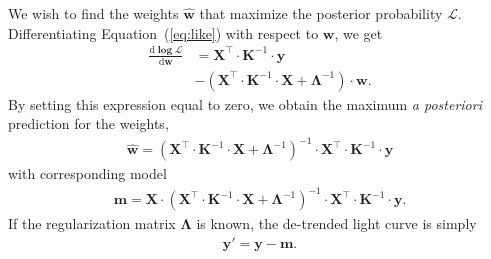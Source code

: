 \documentclass[]{emulateapj}
\begin{document}
We wish to find the weights $\mathbf{\hat{w}}$ that maximize the posterior probability 
$\mathcal{L}$. Differentiating 
Equation~(\ref{eq:like}) with respect to $\mathbf{w}$, we get
%
\begin{align}
\label{eq:gradlike}
\frac{\mathrm{d}\mathbf{\log\mathcal{L}}}{\mathrm{d}\mathbf{w}} &= 
%
\mathbf{X}^\top \cdot \mathbf{K}^{-1} \cdot \mathbf{y} \nonumber\\
%
&- \left( \mathbf{X}^\top \cdot \mathbf{K}^{-1} \cdot \mathbf{X} + \mathbf{\Lambda}^{-1} \right) \cdot \mathbf{w}.
\end{align}
%
By setting this expression equal to zero, we obtain the maximum \emph{a posteriori} prediction 
for the weights,
%
\begin{align}
\label{eq:what}
\mathbf{\hat{w}} = 
%
\left( \mathbf{X}^\top \cdot \mathbf{K}^{-1} \cdot \mathbf{X} + \mathbf{\Lambda}^{-1} \right)^{-1}
%
\cdot \mathbf{X}^\top \cdot \mathbf{K}^{-1} \cdot \mathbf{y}
\end{align}
with corresponding model
%
\begin{align}
\label{eq:model_slow}
\mathbf{m} = 
%
\mathbf{X} \cdot
%
\left( \mathbf{X}^\top \cdot \mathbf{K}^{-1} \cdot \mathbf{X} + \mathbf{\Lambda}^{-1} \right)^{-1}
%
\cdot \mathbf{X}^\top \cdot \mathbf{K}^{-1} \cdot \mathbf{y}.
\end{align}
%
If the regularization matrix $\mathbf{\Lambda}$ is known, the de-trended light curve
is simply
\begin{align}
\label{eq:detrended}
\mathbf{y}' = \mathbf{y} - \mathbf{m}.
\end{align}
\end{document}
